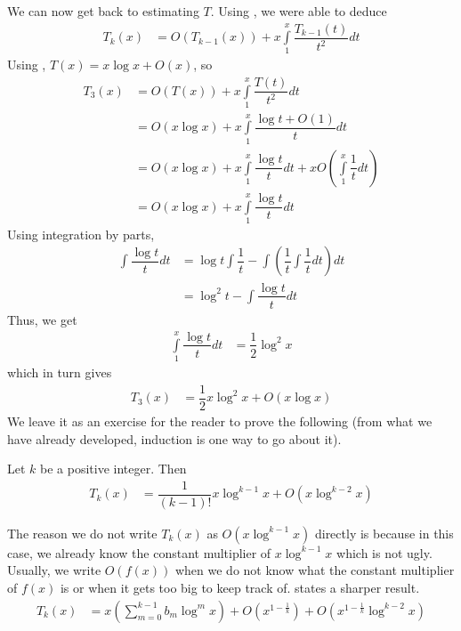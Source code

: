 \documentclass[elemannt.tex]{subfile}
\begin{document}
	We can now get back to estimating $T$. Using , we were able to deduce
		\begin{align*}
			T_{k}(x)
				& = O\left(T_{k-1}(x)\right)+x\int\limits_{1}^{x}\dfrac{T_{k-1}(t)}{t^{2}}dt
		\end{align*}
	Using , $T(x)=x\log{x}+O(x)$, so
		\begin{align*}
			T_{3}(x)
				& = O(T(x))+x\int\limits_{1}^{x}\dfrac{T(t)}{t^{2}}dt\\
				& = O(x\log{x})+x\int\limits_{1}^{x}\dfrac{\log{t}+O(1)}{t}dt\\
				& = O(x\log{x})+x\int\limits_{1}^{x}\dfrac{\log{t}}{t}dt+xO\left(\int\limits_{1}^{x}\dfrac{1}{t}dt\right)\\
				& = O(x\log{x})+x\int\limits_{1}^{x}\dfrac{\log{t}}{t}dt
		\end{align*}
	Using integration by parts,
		\begin{align*}
			\int\dfrac{\log{t}}{t}dt
				& = \log{t}\int\dfrac{1}{t}-\int\left(\dfrac{1}{t}\int\dfrac{1}{t}dt\right)dt\\
				& = \log^{2}{t}-\int\dfrac{\log{t}}{t}dt
		\end{align*}
	Thus, we get
		\begin{align*}
			\int\limits_{1}^{x}\dfrac{\log{t}}{t}dt
				& = \dfrac{1}{2}\log^{2}{x}
		\end{align*}
	which in turn gives
		\begin{align*}
			T_{3}(x)
				& = \dfrac{1}{2}x\log^{2}{x}+O(x\log{x})
		\end{align*}
	We leave it as an exercise for the reader to prove the following (from what we have already developed, induction is one way to go about it).
		\begin{theorem}
			Let $k$ be a positive integer. Then
				\begin{align*}
					T_{k}(x)
						& = \dfrac{1}{(k-1)!}x\log^{k-1}{x}+O\left(x\log^{k-2}{x}\right)
				\end{align*}
		\end{theorem}
	The reason we do not write $T_{k}(x)$ as $O\left(x\log^{k-1}{x}\right)$ directly is because in this case, we already know the constant multiplier of $x\log^{k-1}{x}$ which is not ugly. Usually, we write $O(f(x))$ when we do not know what the constant multiplier of $f(x)$ is or when it gets too big to keep track of. \textcite[Page $2$]{landau_1912_0} states a sharper result.
		\begin{align*}
			T_{k}(x)
				& = x\left(\sum_{m=0}^{k-1}b_{m}\log^{m}{x}\right)+O\left(x^{1-\frac{1}{k}}\right)+O\left(x^{1-\frac{1}{k}}\log^{k-2}{x}\right)
		\end{align*}
\end{document}
